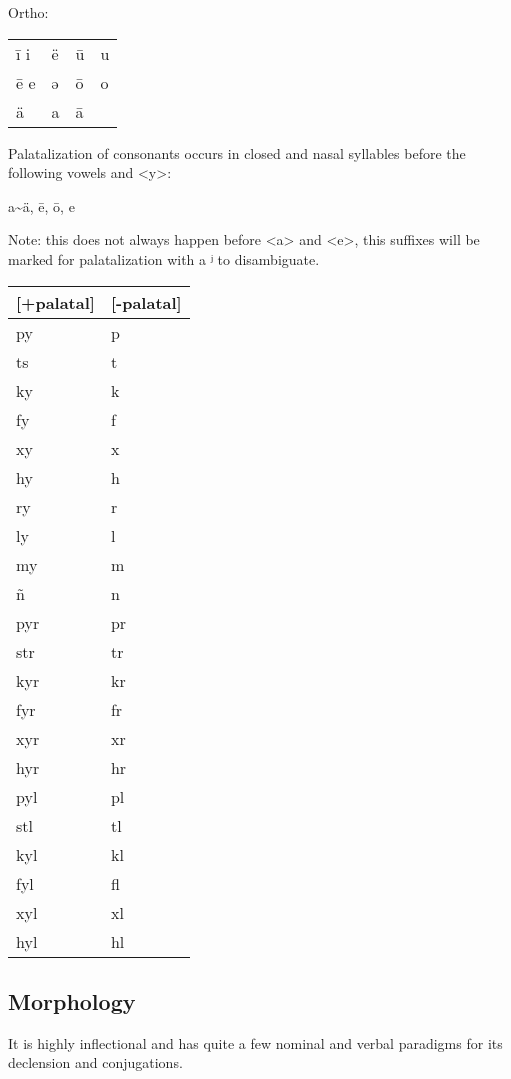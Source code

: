 \documentclass[11pt,a4paper]{article}
\begin{document}
Ortho:
\begin{center}
\begin{tabular}{llll}
ī  i & ë & ū & u\\
ē  e & ə & ō & o\\
ä & a & ā & \\
\end{tabular}
\end{center}



Palatalization of consonants occurs in closed and nasal syllables before the
following vowels and <y>:

a\textasciitilde{}ä, ē, ō, e

Note: this does not always happen before <a> and <e>, this suffixes will be
marked for palatalization with a ʲ to disambiguate.

\begin{center}
\begin{tabular}{ll}
[+palatal] & [-palatal]\\
\hline
py & p\\
ts & t\\
ky & k\\
fy & f\\
xy & x\\
hy & h\\
ry & r\\
ly & l\\
my & m\\
ñ & n\\
pyr & pr\\
str & tr\\
kyr & kr\\
fyr & fr\\
xyr & xr\\
hyr & hr\\
pyl & pl\\
stl & tl\\
kyl & kl\\
fyl & fl\\
xyl & xl\\
hyl & hl\\
\end{tabular}
\end{center}

\subsection{Morphology}
\label{sec:org6ca0e41}
It is highly inflectional and has quite a few nominal and verbal paradigms for
its declension and conjugations.
\end{document}
